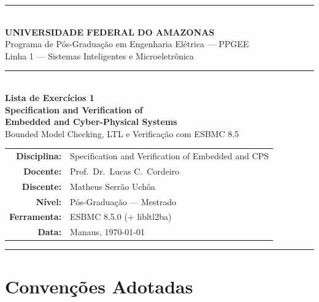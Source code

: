 \documentclass[12pt,a4paper]{article}
\begin{document}
\begin{titlepage}
\centering
\vspace*{0.5cm}

{\color{ufamblue}\rule{\linewidth}{2pt}}\\[0.4cm]
{\Large\bfseries\color{ufamblue} UNIVERSIDADE FEDERAL DO AMAZONAS}\\[0.2cm]
{\large\color{ufamblue} Programa de P\'os-Gradua\c{c}\~ao em Engenharia El\'etrica --- PPGEE}\\[0.1cm]
{\large\color{ufamblue} Linha 1 --- Sistemas Inteligentes e Microeletr\^onica}\\[0.4cm]
{\color{ufamblue}\rule{\linewidth}{2pt}}\\[2.5cm]

{\LARGE\bfseries Lista de Exerc\'icios 1}\\[0.4cm]
{\Large\bfseries Specification and Verification of}\\[0.1cm]
{\Large\bfseries Embedded and Cyber-Physical Systems}\\[0.3cm]
{\large Bounded Model Checking, LTL e Verifica\c{c}\~ao com ESBMC 8.5}\\[3cm]

\begin{tabular}{rl}
  \textbf{Disciplina:} & Specification and Verification of Embedded and CPS \\[0.3cm]
  \textbf{Docente:}    & Prof.\ Dr.\ Lucas C.\ Cordeiro \\[0.3cm]
  \textbf{Discente:}   & Matheus Serr\~ao Uch\^oa \\[0.3cm]
  \textbf{N\'ivel:}    & P\'os-Gradua\c{c}\~ao --- Mestrado \\[0.3cm]
  \textbf{Ferramenta:} & ESBMC 8.5.0 (+ libltl2ba) \\[0.3cm]
  \textbf{Data:}       & Manaus, \today \\
\end{tabular}

\vfill
{\color{ufamblue}\rule{\linewidth}{1.5pt}}
\end{titlepage}

\newpage
\tableofcontents
\newpage

\section*{Conven\c{c}\~oes Adotadas}
\end{document}
